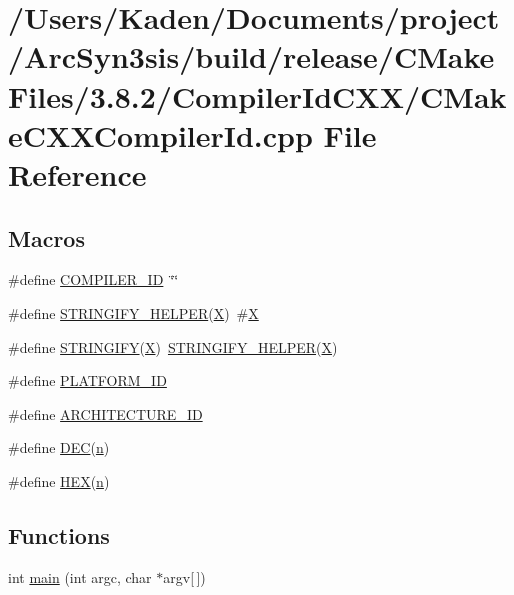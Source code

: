 \hypertarget{a00795}{}\section{/\+Users/\+Kaden/\+Documents/project/\+Arc\+Syn3sis/build/release/\+C\+Make\+Files/3.8.2/\+Compiler\+Id\+C\+X\+X/\+C\+Make\+C\+X\+X\+Compiler\+Id.cpp File Reference}
\label{a00795}
\subsection*{Macros}
\begin{DoxyCompactItemize}
\item 
\#define \hyperlink{a00795_a81dee0709ded976b2e0319239f72d174}{C\+O\+M\+P\+I\+L\+E\+R\+\_\+\+ID}~\char`\"{}\char`\"{}
\item 
\#define \hyperlink{a00795_a2ae9b72bb13abaabfcf2ee0ba7d3fa1d}{S\+T\+R\+I\+N\+G\+I\+F\+Y\+\_\+\+H\+E\+L\+P\+ER}(\hyperlink{a00611_a708712aede48a739e9ae0c42413ef460}{X})~\#\hyperlink{a00611_a708712aede48a739e9ae0c42413ef460}{X}
\item 
\#define \hyperlink{a00795_a43e1cad902b6477bec893cb6430bd6c8}{S\+T\+R\+I\+N\+G\+I\+FY}(\hyperlink{a00611_a708712aede48a739e9ae0c42413ef460}{X})~\hyperlink{a00801_a2ae9b72bb13abaabfcf2ee0ba7d3fa1d}{S\+T\+R\+I\+N\+G\+I\+F\+Y\+\_\+\+H\+E\+L\+P\+ER}(\hyperlink{a00611_a708712aede48a739e9ae0c42413ef460}{X})
\item 
\#define \hyperlink{a00795_adbc5372f40838899018fadbc89bd588b}{P\+L\+A\+T\+F\+O\+R\+M\+\_\+\+ID}
\item 
\#define \hyperlink{a00795_aba35d0d200deaeb06aee95ca297acb28}{A\+R\+C\+H\+I\+T\+E\+C\+T\+U\+R\+E\+\_\+\+ID}
\item 
\#define \hyperlink{a00795_ad1280362da42492bbc11aa78cbf776ad}{D\+EC}(\hyperlink{a00623_a781a04ab095280f838ff3eb0e51312e0}{n})
\item 
\#define \hyperlink{a00795_a46d5d95daa1bef867bd0179594310ed5}{H\+EX}(\hyperlink{a00623_a781a04ab095280f838ff3eb0e51312e0}{n})
\end{DoxyCompactItemize}
\subsection*{Functions}
\begin{DoxyCompactItemize}
\item 
int \hyperlink{a00795_a0ddf1224851353fc92bfbff6f499fa97}{main} (int argc, char $\ast$argv\mbox{[}$\,$\mbox{]})
\end{DoxyCompactItemize}
